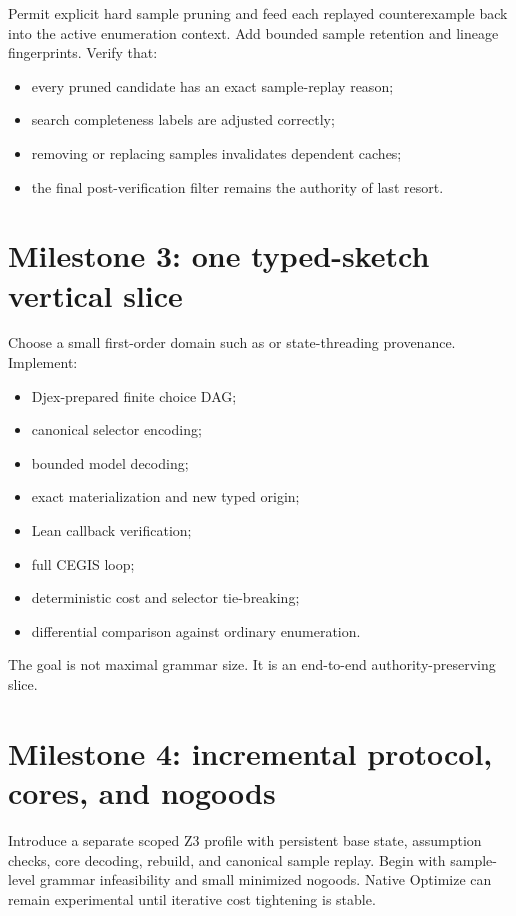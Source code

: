 \documentclass[10pt,letterpaper,oneside]{report}
\newcommand{\code}[1]{\texttt{\detokenize{#1}}}
\begin{document}
Permit explicit hard sample pruning and feed each replayed counterexample back into the active enumeration context. Add bounded sample retention and lineage fingerprints. Verify that:

\begin{itemize}
\item every pruned candidate has an exact sample-replay reason;
\item search completeness labels are adjusted correctly;
\item removing or replacing samples invalidates dependent caches;
\item the final post-verification filter remains the authority of last resort.
\end{itemize}

\section{Milestone 3: one typed-sketch vertical slice}

Choose a small first-order domain such as \code{Option.bind} or state-threading provenance. Implement:

\begin{itemize}
\item Djex-prepared finite choice DAG;
\item canonical selector encoding;
\item bounded model decoding;
\item exact materialization and new typed origin;
\item Lean callback verification;
\item full CEGIS loop;
\item deterministic cost and selector tie-breaking;
\item differential comparison against ordinary enumeration.
\end{itemize}

The goal is not maximal grammar size. It is an end-to-end authority-preserving slice.

\section{Milestone 4: incremental protocol, cores, and nogoods}

Introduce a separate scoped Z3 profile with persistent base state, assumption checks, core decoding, rebuild, and canonical sample replay. Begin with sample-level grammar infeasibility and small minimized nogoods. Native Optimize can remain experimental until iterative cost tightening is stable.
\end{document}
